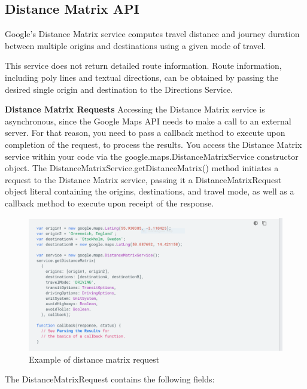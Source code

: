 \subsection{Distance Matrix API}
\hspace{2cm} Google's Distance Matrix service computes travel distance and journey duration between multiple origins and destinations using a given mode of travel.

This service does not return detailed route information. Route information, including poly lines and textual directions, can be obtained by passing the desired single origin and destination to the Directions Service.

\textbf{Distance Matrix Requests}
Accessing the Distance Matrix service is asynchronous, since the Google Maps API needs to make a call to an external server. For that reason, you need to pass a callback method to execute upon completion of the request, to process the results.
You access the Distance Matrix service within your code via the google.maps.DistanceMatrixService constructor object. The DistanceMatrixService.getDistanceMatrix() method initiates a request to the Distance Matrix service, passing it a DistanceMatrixRequest object literal containing the origins, destinations, and travel mode, as well as a callback method to execute upon receipt of the response.
\begin{figure}[htp]%
    \centre%
    \includegraphics[width=1\textwidth]{images/ch4/request.PNG}%
    \caption[Example of distance matrix request]{Example of distance matrix request}\label{fig:Example of distance matrix request}%
  \end{figure}
 The DistanceMatrixRequest contains the following fields:
